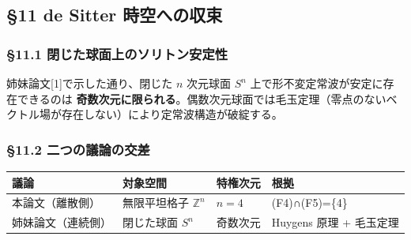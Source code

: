 \documentclass[
  a4paper,11pt]{ltjsarticle}
\newcounter{none}
\theoremstyle{definition}
\theoremstyle{remark}
\begin{document}
\subsection{§11 de Sitter
時空への収束}\label{de-sitter-ux6642ux7a7aux3078ux306eux53ceux675f}

\subsubsection{§11.1
閉じた球面上のソリトン安定性}\label{ux9589ux3058ux305fux7403ux9762ux4e0aux306eux30bdux30eaux30c8ux30f3ux5b89ux5b9aux6027}

姉妹論文{[}1{]}で示した通り、閉じた \(n\) 次元球面 \(S^n\)
上で形不変定常波が安定に存在できるのは
\textbf{奇数次元に限られる}。偶数次元球面では毛玉定理（零点のないベクトル場が存在しない）により定常波構造が破綻する。

\subsubsection{§11.2
二つの議論の交差}\label{ux4e8cux3064ux306eux8b70ux8ad6ux306eux4ea4ux5dee}

{\def\LTcaptype{none} %
\begin{longtable}[]{@{}
  >{\raggedright\arraybackslash}p{}
  >{\raggedright\arraybackslash}p{}
  >{\raggedright\arraybackslash}p{}
  >{\raggedright\arraybackslash}p{}@{}}
\toprule\noalign{}
\begin{minipage}[b]{\linewidth}\raggedright
議論
\end{minipage} & \begin{minipage}[b]{\linewidth}\raggedright
対象空間
\end{minipage} & \begin{minipage}[b]{\linewidth}\raggedright
特権次元
\end{minipage} & \begin{minipage}[b]{\linewidth}\raggedright
根拠
\end{minipage} \\
\midrule\noalign{}
\endhead
\bottomrule\noalign{}
\endlastfoot
本論文（離散側） & 無限平坦格子 \(\mathbb{Z}^n\) & \(n = 4\) &
(F4)∩(F5)=\{4\} \\
姉妹論文（連続側） & 閉じた球面 \(S^n\) & 奇数次元 & Huygens 原理 +
毛玉定理 \\
\end{longtable}
}
\end{document}
